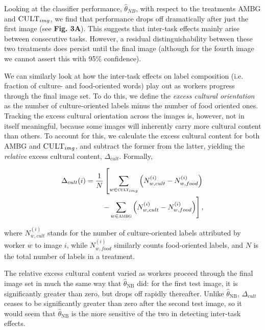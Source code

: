 \documentclass[letterpaper,twocolumn]{article}
\begin{document}
Looking at the classifier performance, $\hat{\theta}_{NB}$, with respect to the
treatments \textsc{AMBG} and $\textsc{CULT}_{img}$, we find that performance
drops off dramatically after just the first image (see \textbf{Fig. 3A}).
This suggests that inter-task effects mainly arise between consecutive tasks.
However, a residual distinguishability between these two treatments does 
persist until the final image (although for the fourth image we cannot assert
this with 95\% confidence).

We can similarly look at how the inter-task effects on label composition
(i.e. fraction of culture- and food-oriented words) play out as workers 
progress through the final image set.  To do this, we define the 
\textit{excess cultural orientation} as the number of culture-oriented labels 
minus the number of food oriented ones.  Tracking the excess cultural 
orientation across the images is, however, not in itself meaningful,
because some images will inherently carry more cultural content than others. 
To account for this, we calculate the excess cultural content for both 
\textsc{AMBG} and $\textsc{CULT}_{img}$, and subtract the former from the 
latter, yielding the \textit{relative} excess cultural content, 
$\Delta_{cult}$.  Formally,

\begin{align}
	\Delta_{cult}(i) = \frac{1}{N}\left[ \sum_{w\in\textsc{cult}_{img}} \left(N_{w,cult}^{(i)} - N_{w,food}^{(i)}\right)\right. \\
\left.	- \sum_{w\in\textsc{ambg}} \left(N_{w,cult}^{(i)} - N_{w,food}^{(i)}\right)\right],
\end{align}

where $N_{w,cult}^{(i)}$ stands for the number of culture-oriented labels 
attributed by worker $w$ to image $i$, while $N_{w,food}^{(i)}$ similarly 
counts food-oriented labels, and $N$ is the total number of labels in a 
treatment.  

The relative excess cultural content varied as workers proceed through the
final image set in much the same way that $\hat{\theta}_\text{NB}$ did: for the
first test image, it is significantly greater than zero, but drops off rapidly
thereafter.  Unlike $\hat{\theta}_\text{NB}$, $\Delta_{cult}$ ceases to
be significantly greater than zero after the second test image, so it would 
seem that $\hat{\theta}_\text{NB}$ is the more sensitive of the two in
detecting inter-task effects.
\end{document}
